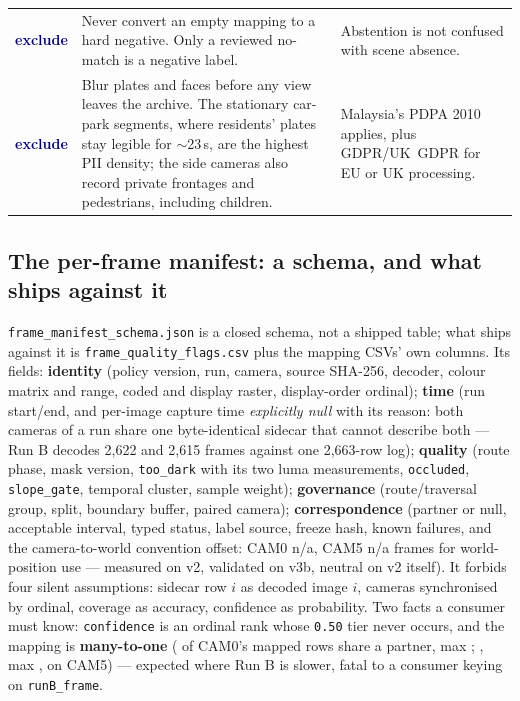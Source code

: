 \documentclass[10pt,a4paper]{article}
\newcommand{\no}{\textcolor{navy}{\textbf{exclude}}}
\providecommand{\ConventionShiftFrames}{n/a}
\providecommand{\ConventionCamZeroShift}{n/a}
\begin{document}
{\begin{tabularx}{\textwidth}{@{}p{2.1cm}YY@{}}
\no & Never convert an empty mapping to a hard negative. Only a reviewed no-match is a negative label. & Abstention is not confused with scene absence. \\
\no & Blur plates and faces before any view leaves the archive. The stationary car-park segments, where residents' plates stay legible for $\sim$23\,s, are the highest PII density; the side cameras also record private frontages and pedestrians, including children. & Malaysia's PDPA 2010 applies, plus GDPR/UK~GDPR for EU or UK processing. \\
\bottomrule
\end{tabularx}}

\vspace{2pt}
\subsection{The per-frame manifest: a schema, and what ships against it}

\texttt{frame\_manifest\_schema.json} is a closed schema, not a shipped table;
what ships against it is \texttt{frame\_quality\_flags.csv} plus the mapping
CSVs' own columns. Its fields: \textbf{identity} (policy version, run, camera,
source SHA-256, decoder, colour matrix and range, coded and display raster,
display-order ordinal); \textbf{time} (run start/end, and per-image capture time
\emph{explicitly null} with its reason: both cameras of a run share one
byte-identical sidecar that cannot describe both --- Run B decodes 2{,}622 and
2{,}615 frames against one 2{,}663-row log); \textbf{quality} (route phase, mask
version, \texttt{too\_dark} with its two luma measurements, \texttt{occluded},
\texttt{slope\_gate}, temporal cluster, sample weight); \textbf{governance}
(route/traversal group, split, boundary buffer, paired camera);
\textbf{correspondence} (partner or null, acceptable interval, typed status,
label source, freeze hash, known failures, and the camera-to-world convention
offset: CAM0 \ConventionCamZeroShift{}, CAM5 \ConventionShiftFrames{} frames for
world-position use --- measured on v2, validated on v3b, neutral on v2 itself).
It forbids four silent assumptions: sidecar row $i$ as decoded image $i$,
cameras synchronised by ordinal, coverage as accuracy, confidence as
probability. Two facts a consumer must know: \texttt{confidence} is an ordinal
rank whose \texttt{0.50} tier never occurs, and the mapping is
\textbf{many-to-one} (\ManyToOneCamZero{} of CAM0's mapped rows share a partner,
max \ManyToOneMaxCamZero{}; \ManyToOneCamFive{}, max \ManyToOneMaxCamFive{}, on
CAM5) --- expected where Run B is slower, fatal to a consumer keying on
\texttt{runB\_frame}.
\end{document}
